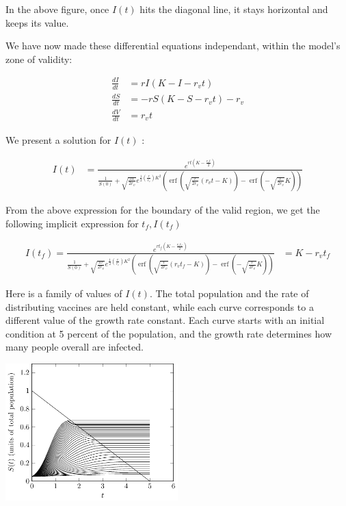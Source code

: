 \documentclass[titlepage]{article}
\DeclareMathOperator\erf{erf}
\begin{document}
In the above figure, once $I(t)$ hits the diagonal line,
	it stays horizontal and keeps its value.

We have now made these differential equations independant,
	within the model's zone of validity:

\begin{align*}
\frac{dI}{dt} & = r I \left( K - I - r_v t \right)\\
\frac{dS}{dt} & = - r S \left( K - S - r_v t \right) - r_v \\
\frac{dV}{dt} & = r_v t
\end{align*}

We present a solution for $I(t)$ \cite{walph}:

\begin{align}
I(t) & =
	\frac{e^{ r t (K - \frac{ r_v t}{2})}}
	{\frac{1}{S(0)} + \sqrt{\frac{\pi r}{2 r_v}}
		e^{\frac12 \left( \frac{r}{r_v} \right) K^2}
		\left(\erf\left(  \sqrt{\frac{r}{2 r_v}} (r_v t - K ) \right)
			- \erf\left( - \sqrt{\frac{r}{2 r_v}} K \right) \right)}
\end{align}

From the above expression for the boundary of the valid region,
	we get the following implicit expression for $t_f, I(t_f)$

\begin{align}
I(t_f) =
	\frac{e^{ r t_f (K - \frac{ r_v t_f }{2})}}
	{\frac{1}{S(0)} + \sqrt{\frac{\pi r}{2 r_v}}
		e^{\frac12 \left( \frac{r}{r_v} \right) K^2}
		\left(\erf\left(  \sqrt{\frac{r}{2 r_v}} (r_v t_f - K ) \right)
			- \erf\left( - \sqrt{\frac{r}{2 r_v}} K \right) \right)}
	& = K - r_v t_f
\end{align}

Here is a family of values of $I(t)$.
The total population and the rate of distributing vaccines are
	held constant, while each curve corresponds to a different
	value of the growth rate constant.
Each curve starts with an initial condition at 5 percent of the
	population, and the growth rate determines how many people
	overall are infected.

\includegraphics[width=0.5\textwidth]{figures/vaccination-model-curves-varying-s.pdf}
\end{document}

